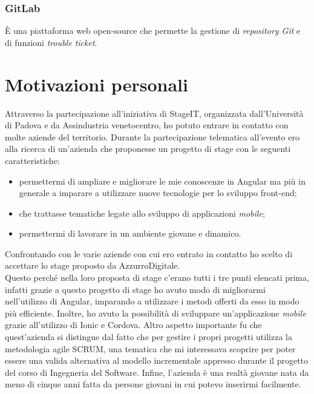 \subsubsection{GitLab}
È una piattaforma web \gls{open-source}\ap{[g]} che permette la gestione di \emph{repository Git} e di funzioni \emph{trouble ticket}.

\section{Motivazioni personali}
Attraverso la partecipazione all'iniziativa di StageIT, organizzata dall'Università di Padova e da Assindustria venetocentro, ho potuto entrare in contatto con molte aziende del territorio.
Durante la partecipazione telematica all'evento ero alla ricerca di un’azienda che proponesse un progetto di stage con le seguenti caratteristiche:

\begin{itemize}
	\item permettermi di ampliare e migliorare le mie conoscenze in Angular ma più in generale a imparare a utilizzare nuove tecnologie per lo sviluppo \gls{front-end}\ap{[g]};
	\item che trattasse tematiche legate allo sviluppo di applicazioni \emph{mobile};
	\item permettermi di lavorare in un ambiente giovane e dinamico.
	
\end{itemize}  

Confrontando con le varie aziende con cui ero entrato in contatto ho scelto di accettare lo stage proposto da AzzurroDigitale. \\

Questo perché nella loro proposta di stage c'erano tutti i tre punti elencati prima, infatti grazie a questo progetto di stage ho avuto modo di migliorarmi nell’utilizzo di Angular, imparando a utilizzare i metodi offerti da esso in modo più efficiente. Inoltre, ho avuto la possibilità di sviluppare un’applicazione \emph{mobile} grazie all'utilizzo di Ionic e Cordova. Altro aspetto importante fu che quest'azienda si distingue dal fatto che per gestire i propri progetti utilizza la metodologia agile \gls{SCRUM}, una tematica che mi interessava scoprire per poter essere una valida alternativa al modello incrementale appresso durante il progetto del corso di Ingegneria del Software. Infine, l'azienda è una realtà giovane nata da meno di cinque anni fatta da persone giovani in cui potevo inserirmi facilmente.
